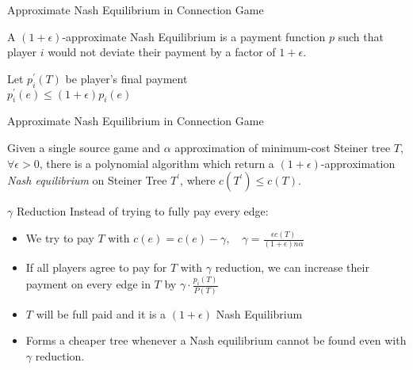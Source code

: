 \documentclass[11pt,aspectratio=169]{beamer}
\begin{document}
\begin{frame}{Approximate Nash Equilibrium in Connection Game}
    \begin{definition}
	    A \((1+\epsilon)\)-approximate Nash Equilibrium is a payment function \(p\) such that player \(i\) would not deviate their payment by a factor of \(1+\epsilon\).
    \end{definition}
    Let $ p_i^{'}(T)$ be player's final payment\\
   \centering
    $ p_i^{'}(e) \leq (1+\epsilon)p_i(e)$

\end{frame}

\begin{frame}{Approximate Nash Equilibrium in Connection Game}
    \begin{theorem}
        Given a single source game and \(\alpha\) approximation of minimum-cost Steiner tree \(T\), \(\forall \epsilon > 0\), there is a polynomial algorithm which return a \((1+\epsilon)\)-approximation \textit{Nash equilibrium} on Steiner Tree \(T^{'}\), where $c(T^{'}) \leq c(T)$.
    \end{theorem}
\end{frame}

\begin{frame}{$\gamma$ Reduction}
    Instead of trying to fully pay every edge: 
    \begin{itemize}
        \item We try to pay $T$ with $c(e) = c(e) - \gamma, \quad \gamma = \frac{\epsilon c(T)}{(1+\epsilon)n\alpha}$
        \item If all players agree to pay for $T$ with $\gamma$ reduction, we can increase their payment on every edge in $T$ by $\gamma \cdot \frac{p_i(T)}{P(T)}$
        \item $T$ will be full paid and it is a $(1+\epsilon)$ Nash Equilibrium
        \item Forms a cheaper tree whenever a Nash equilibrium cannot be found even with $\gamma$ reduction.
    \end{itemize}
    
   \end{frame}
\end{document}
